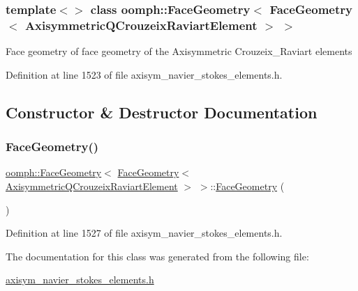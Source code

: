 \subsubsection*{template$<$$>$\newline
class oomph\+::\+Face\+Geometry$<$ Face\+Geometry$<$ Axisymmetric\+Q\+Crouzeix\+Raviart\+Element $>$ $>$}

Face geometry of face geometry of the Axisymmetric Crouzeix\+\_\+\+Raviart elements 

Definition at line 1523 of file axisym\+\_\+navier\+\_\+stokes\+\_\+elements.\+h.



\subsection{Constructor \& Destructor Documentation}
\mbox{\label{classoomph_1_1FaceGeometry_3_01FaceGeometry_3_01AxisymmetricQCrouzeixRaviartElement_01_4_01_4_ab23b8b50e56f9c8e6f46551ed8007599}} 
\subsubsection{\texorpdfstring{Face\+Geometry()}{FaceGeometry()}}
{\footnotesize\ttfamily \hyperlink{classoomph_1_1FaceGeometry}{oomph\+::\+Face\+Geometry}$<$ \hyperlink{classoomph_1_1FaceGeometry}{Face\+Geometry}$<$ \hyperlink{classoomph_1_1AxisymmetricQCrouzeixRaviartElement}{Axisymmetric\+Q\+Crouzeix\+Raviart\+Element} $>$ $>$\+::\hyperlink{classoomph_1_1FaceGeometry}{Face\+Geometry} (\begin{DoxyParamCaption}{ }\end{DoxyParamCaption})\hspace{0.3cm}{\ttfamily [inline]}}



Definition at line 1527 of file axisym\+\_\+navier\+\_\+stokes\+\_\+elements.\+h.



The documentation for this class was generated from the following file\+:\begin{DoxyCompactItemize}
\item 
\hyperlink{axisym__navier__stokes__elements_8h}{axisym\+\_\+navier\+\_\+stokes\+\_\+elements.\+h}\end{DoxyCompactItemize}
